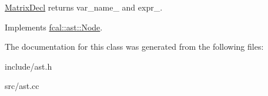\hyperlink{classfcal_1_1ast_1_1MatrixDecl}{Matrix\+Decl} returns var\+\_\+name\+\_\+ and expr\+\_\+. 

Implements \hyperlink{classfcal_1_1ast_1_1Node_a81865f5a1df593708a39bf492952742a}{fcal\+::ast\+::\+Node}.



The documentation for this class was generated from the following files\+:\begin{DoxyCompactItemize}
\item 
include/ast.\+h\item 
src/ast.\+cc\end{DoxyCompactItemize}
